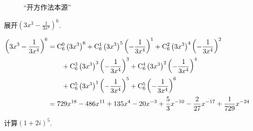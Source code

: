 \begin{figure}[htp]
    \caption{“开方作法本源”}
\end{figure}

\begin{example}
    展开$\left(3x^{3}-\frac{1}{3x^{4}}\right)^{6}$.
\end{example}

\begin{solution}
\[\begin{split}
\left(3x^{3}-\frac{1}{3x^{4}}\right)^{6}&=\comb{6}{0}\left(3x^{3}\right)^{6}+\comb{6}{1}\left(3x^{3}\right)^{5}\left(-\frac{1}{3x^{4}}\right)^{1}+\comb{6}{2}\left(3x^{3}\right)^{4}\left(-\frac{1}{3x^{4}}\right)^{2}\\
&\qquad +\comb{6}{3}\left(3x^{3}\right)^{3}\left(-\frac{1}{3x^{4}}\right)^{3}+\comb{6}{4}\left(3x^{3}\right)^{2}\left(-\frac{1}{3x^{4}}\right)^{4}\\
&\qquad +\comb{6}{5}\left(3x^{3}\right)^{1}\left(-\frac{1}{3x^{4}}\right)^{5}+\comb{6}{5}\left(-\frac{1}{3x^{4}}\right)^{6}\\
&=729x^{18}-486x^{11}+135x^{4}-20x^{-3}+\frac{5}{3}x^{-10}
-\frac{2}{27}x^{-17}+\frac{1}{729}x^{-24}
\end{split}\]
\end{solution}
 
\begin{example}
    计算$ (1+2i)^{5}$.
\end{example}

